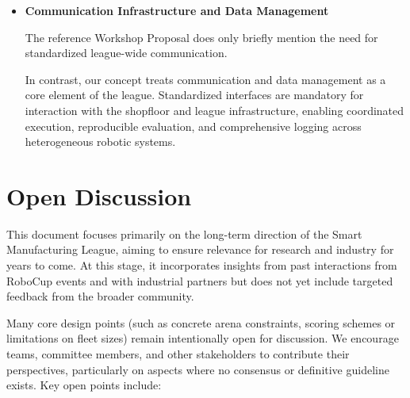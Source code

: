 \documentclass[letterpaper, 11pt]{extarticle}
\begin{document}
\begin{itemize}
\item \textbf{Communication Infrastructure and Data Management}

The reference Workshop Proposal does only briefly mention the need for standardized league-wide communication.

In contrast, our concept treats communication and data management as a core element of the league. Standardized interfaces are mandatory for interaction with the shopfloor and league infrastructure, enabling coordinated execution, reproducible evaluation, and comprehensive logging across heterogeneous robotic systems.
\end{itemize}
\section{Open Discussion}
This document focuses primarily on the long-term direction of the Smart Manufacturing League, aiming to ensure relevance for research and industry for years to come.
At this stage, it incorporates insights from past interactions from RoboCup events and with industrial partners but does not yet include targeted feedback from the broader community.  

Many core design points (such as concrete arena constraints, scoring schemes or limitations on fleet sizes) remain intentionally open for discussion.
We encourage teams, committee members, and other stakeholders to contribute their perspectives, particularly on aspects where no consensus or definitive guideline exists. Key open points include:
\end{document}
